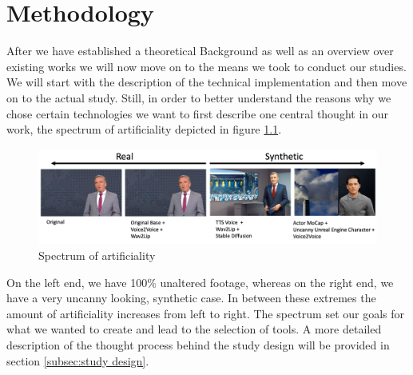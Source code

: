 \documentclass[
  a4paper,  %
  twoside,  %
  bibliography=totoc,
  headsepline,
  cleardoublepage=empty,
  parskip=half,
  draft=false
]{scrbook}
\begin{document}
\chapter{Methodology}
After we have established a theoretical Background as well as an overview over existing works we will now move on to the means we took to conduct our studies. We will start with the description of the technical implementation and then move on to the actual study. Still, in order to better understand the reasons why we chose certain technologies we want to first describe one central thought in our work, the spectrum of artificiality depicted in figure \ref{fig:spectrum}.
\begin{figure}[h]
  \centering
  \includegraphics[width=1\textwidth]{./graphics/images/spectrum-art.png}
  \caption{Spectrum of artificiality}
  \label{fig:spectrum}
\end{figure}
On the left end, we have 100\% unaltered footage, whereas on the right end, we have a very uncanny looking, synthetic case. In between these extremes the amount of artificiality increases from left to right. The spectrum set our goals for what we wanted to create and lead to the selection of tools. A more detailed description of the thought process behind the study design will be provided in section \ref{subsec:study design}. 

\newpage
\end{document}

